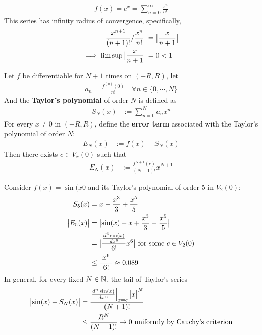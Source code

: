\documentclass[11pt]{article}
\begin{document}
 	\begin{example}
 		\begin{align}
 			f(x) = e^x = \sum_{n=0}^\infty \frac{x^n}{n!}
 		\end{align}
 		This series has infinity radius of convergence, specifically,
 		\begin{align}
 			\big \vert {\frac{x^{n+1}}{(n+1)!} / \frac{x^n}{n!}} \big \vert &= \big \vert {\frac{x}{n+1}} \big \vert \\
 			\implies \limsup \big \vert {\frac{x}{n+1}} \big \vert &= 0 < 1
 		\end{align}
 	\end{example}
 	
 	\begin{theorem}
 		Let $f$ be differentiable for $N+1$ times on $(-R, R)$, let 
 		\begin{align}
 			a_n = \frac{f^{(n)}(0)}{n!}\quad \forall n \in \{0, \cdots, N\}
 		\end{align}
 		And the \textbf{Taylor's polynomial} of order $N$ is defined as
 		\begin{align}
 			S_N(x) &:= \sum_{n=0}^N a_n x^n
 		\end{align}
 		For every $x \neq 0$ in $(-R, R)$, define the \textbf{error term} associated with the Taylor's polynomial of order $N$:
 		\begin{align}
 			E_N(x) &:= f(x) - S_N(x)
 		\end{align}
 		Then there exists $c \in V_x(0)$ such that 
 		\begin{align}
 			E_N(x) &:= \frac{f^{N+1}(c)}{(N+1)!} x^{N+1}
 		\end{align}
 	\end{theorem}
 	
 	\begin{example}
 		Consider $f(x) = \sin(x0$ and its Taylor's polynomial of order 5 in $V_2(0)$:
 		\begin{align}
 			S_5(x) &= x - \frac{x^3}{3} + \frac{x^5}{5} \\
 			\big \vert {E_5(x)} \big \vert &= \big \vert {\sin(x) - x + \frac{x^3}{3} - \frac{x^5}{5}} \big \vert \\
 			&= \big \vert {
 				\frac{\frac{d^6 \sin(x)}{dx^6}}{6!} x^6
 			} \big \vert \text{{ for some }} c \in V_2(0) \\
 			&\leq \frac{\big \vert {x^6} \big \vert}{6!} \approx 0.089
 		\end{align}
 		In general, for every fixed $N \in \mathbb{N}$, the tail of Taylor's series 
 		\begin{align}
 			\big \vert {\sin(x) - S_N(x)} \big \vert &= \frac{
 			\left. \frac{d^n \sin(x)}{dx^n} \right |_{x=c} \big \vert {x} \big \vert^N		
 			}{
 			(N+1)!} \\
 			&\leq \frac{R^N}{(N+1)!} \to 0 \text{{ uniformly by Cauchy's criterion}}
 		\end{align}
 	\end{example}
 
\end{document}
